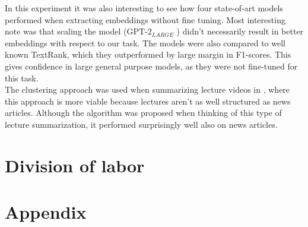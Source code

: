 \documentclass{article}
\newcommand{\gptlarge}{$\text{GPT-2}_{LARGE}$ }
\begin{document}
\noindent
In this experiment it was also interesting to see how four state-of-art models performed when extracting embeddings without fine tuning. Most interesting note was that scaling the model (\gptlarge) didn't necessarily result in better embeddings with respect to our task. The models were also compared to well known TextRank, which they outperformed by large margin in F1-scores. This gives confidence in large general purpose models, as they were not fine-tuned for this task. \\

\noindent
The clustering approach was used when summarizing lecture videos in \cite{extractive_bert}, where this approach is more viable because lectures aren't as well structured as news articles. Although the algorithm was proposed when thinking of this type of lecture summarization, it performed surprisingly well also on news articles. \\


\section{Division of labor}


\section{Appendix}


\end{document}
